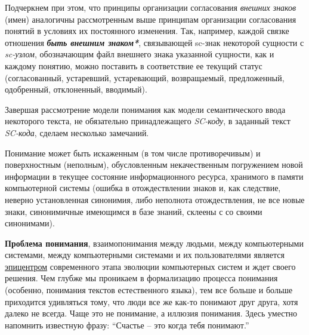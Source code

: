 \begin{SCn}
{Подчеркнем при этом, что принципы организации согласования \textit{внешних знаков} (имен) аналогичны рассмотренным выше принципам организации согласования понятий в условиях их постоянного изменения. Так, например, каждой связке отношения \textit{\textbf{быть внешним знаком*}}, связывающей sc-знак некоторой сущности с \textit{sc-узлом}, обозначающим файл внешнего знака указанной сущности, как и каждому понятию, можно поставить в соответствие ее текущий статус (согласованный, устаревший, устаревающий, возвращаемый, предложенный, одобренный, отклоненный, вводимый). 

Завершая рассмотрение модели понимания как модели семантического ввода некоторого текста, не обязательно принадлежащего \textit{SC-коду}, в заданный текст \textit{SC-кода}, сделаем несколько замечаний. 

Понимание может быть искаженным (в том числе противоречивым) и поверхностным (неполным), обусловленным некачественным погружением новой информации в текущее состояние информационного ресурса, хранимого в памяти компьютерной системы (ошибка в отождествлении знаков и, как следствие, неверно установленная синонимия, либо неполнота отождествления, не все новые знаки, синонимичные имеющимся в базе знаний, склеены с со своими синонимами). 

\textbf{Проблема понимания}, взаимопонимания между людьми, между компьютерными системами, между компьютерными системами и их пользователями является \underline{эпицентром} современного этапа эволюции компьютерных систем и ждет своего решения. Чем глубже мы проникаем в формализацию процесса понимания (особенно, понимания текстов естественного языка), тем все больше и больше приходится удивляться тому, что люди все же как-то понимают друг друга, хотя далеко не всегда. Чаще это не понимание, а иллюзия понимания. Здесь уместно напомнить известную фразу: ``Счастье -- это когда тебя понимают.''\\}

\scnendstruct

\end{SCn}